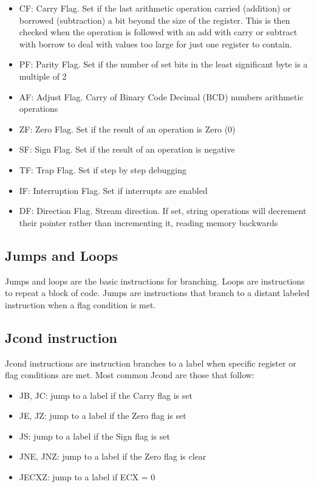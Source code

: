 \begin{itemize}
    \item CF: Carry Flag. Set if the last arithmetic operation carried (addition) or borrowed (subtraction) a bit beyond
the size of the register. This is then checked when the operation is followed with an add with carry or subtract
with borrow to deal with values too large for just one register to contain.
    \item PF: Parity Flag. Set if the number of set bits in the least significant byte is a multiple of 2
    \item AF: Adjust Flag. Carry of Binary Code Decimal (BCD) numbers arithmetic operations
    \item ZF: Zero Flag. Set if the result of an operation is Zero (0)
    \item SF: Sign Flag. Set if the result of an operation is negative
    \item TF: Trap Flag. Set if step by step debugging
    \item IF: Interruption Flag. Set if interrupts are enabled
    \item DF: Direction Flag. Stream direction. If set, string operations will decrement their pointer rather than
incrementing it, reading memory backwards
\end{itemize}

\subsection{Jumps and Loops}

Jumps and loops are the basic instructions for branching. 
Loops are instructions to repeat a block of code.
Jumps are instructions that branch to a distant labeled instruction when a flag condition is met.

\subsection{Jcond instruction}

Jcond instructions are instruction branches to a label when specific register or flag conditions are met. 
Most common Jcond are those that follow:
\begin{itemize}
    \item JB, JC: jump to a label if the Carry flag is set
    \item JE, JZ: jump to a label if the Zero flag is set
    \item JS: jump to a label if the Sign flag is set
    \item JNE, JNZ: jump to a label if the Zero flag is clear
    \item JECXZ: jump to a label if ECX = 0
\end{itemize}

